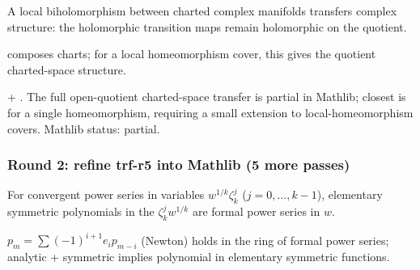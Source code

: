 \begin{lemma}
\label{lem:ctp-r8}
A local biholomorphism between charted complex manifolds transfers complex structure: the holomorphic transition maps remain holomorphic on the quotient.
\leanok
\end{lemma}

\begin{lemma}
\label{lem:ctp-r9}
 composes charts; for a local homeomorphism cover, this gives the quotient charted-space structure.
\leanok\mathlibok
\end{lemma}

\begin{lemma}
\label{lem:ctp-r10}
 + .  The full open-quotient charted-space transfer is partial in Mathlib; closest is  for a single homeomorphism, requiring a small extension to local-homeomorphism covers.  Mathlib status: partial.
\leanok
\end{lemma}

\subsubsection*{Round 2: refine trf-r5 into Mathlib (5 more passes)}

\begin{lemma}
\label{lem:trf-r6}
For convergent power series in variables $w^{1/k}\zeta_{k}^{j}$ ($j=0,\ldots,k-1$), elementary symmetric polynomials in the $\zeta_{k}^{j}w^{1/k}$ are formal power series in $w$.
\leanok
\end{lemma}

\begin{lemma}
\label{lem:trf-r7}
$p_{m} = \sum (-1)^{i+1} e_{i} p_{m-i}$ (Newton) holds in the ring of formal power series; analytic + symmetric implies polynomial in elementary symmetric functions.
\leanok
\end{lemma}

